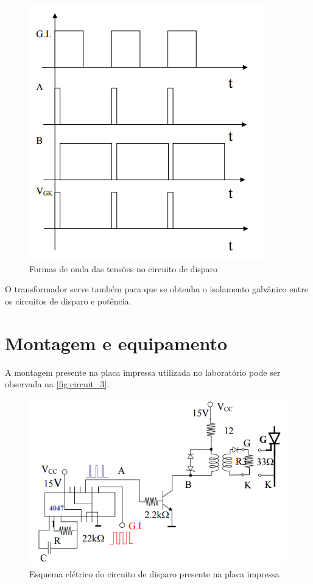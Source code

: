 \documentclass[a4paper,11pt]{article}
\begin{document}
	\begin{figure}[h]
		\centering
		\includegraphics[width=\linewidth]{img/trigger_waveform}
		\caption{Formas de onda das tensões no circuito de disparo}
		\label{fig:circuit_2}
	\end{figure}
	
	O transformador serve também para que se obtenha o isolamento galvânico entre os circuitos de disparo e potência.

	\section{Montagem e equipamento}

	A montagem presente na placa impressa utilizada no laboratório pode ser observada na \autoref{fig:circuit_3}.
	
	\begin{figure}[h]
		\centering
		\includegraphics[width=\linewidth]{img/assembly_circuit}
		\caption{Esquema elétrico do circuito de disparo presente na placa impressa}
		\label{fig:circuit_3}
	\end{figure}
	
\end{document}
